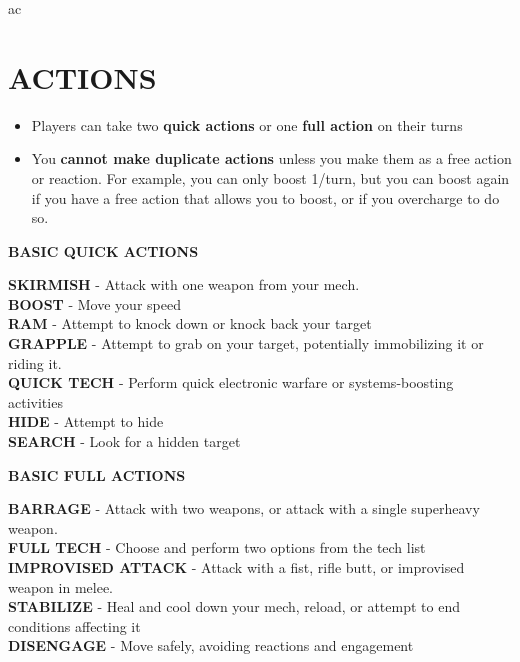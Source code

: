 ac\section{ACTIONS}

\begin{itemize}
    \item Players can take two \textbf{quick actions} or one \textbf{full action} on their turns
    \item You \textbf{cannot make duplicate actions} unless you make them as a free action or reaction. For example, you can only boost 1/turn, but you can boost again if you have a free action that allows you to boost, or if you overcharge to do so.
\end{itemize}

\begin{center}
    \textbf{BASIC QUICK ACTIONS}
\end{center}
\textbf{SKIRMISH} - Attack with one weapon from your mech.\\
\textbf{BOOST} - Move your speed\\
\textbf{RAM} - Attempt to knock down or knock back your target\\
\textbf{GRAPPLE} - Attempt to grab on your target, potentially immobilizing it or riding it.\\
\textbf{QUICK TECH} - Perform quick electronic warfare or systems-boosting activities\\
\textbf{HIDE} - Attempt to hide \\
\textbf{SEARCH} - Look for a hidden target

\begin{center}
    \textbf{BASIC FULL ACTIONS}
\end{center}
\textbf{BARRAGE} - Attack with two weapons, or attack with a single superheavy weapon.\\
\textbf{FULL TECH} - Choose and perform two options from the tech list\\
\textbf{IMPROVISED ATTACK} - Attack with a fist, rifle butt, or improvised weapon in melee.\\
\textbf{STABILIZE} - Heal and cool down your mech, reload, or attempt to end conditions affecting it\\
\textbf{DISENGAGE} - Move safely, avoiding reactions and engagement


